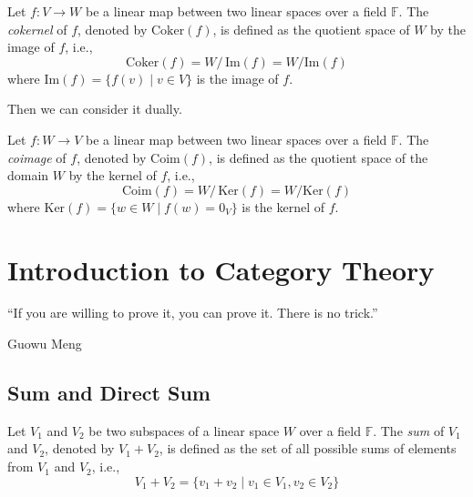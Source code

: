 \documentclass[
	11pt, %
	fleqn, %
	a4paper, %
]{LegrandOrangeBook}
\renewcommand{\ker}[1]{\text{Ker}(#1)} %
\renewcommand{\Im}[1]{\text{Im}(#1)} %
\newcommand{\quotient}[2]{#1 /\, #2} %
\newcommand{\F}{\mathbb{F}} %
\newcommand{\coker}[1]{\text{Coker}(#1)} %
\newcommand{\coim}[1]{\text{Coim}(#1)} %
\begin{document}
\begin{definition}[Cokernel]
    Let $f : V \to W$ be a linear map between two linear spaces over a field $\F$. The \emph{cokernel} of $f$, denoted by $\coker{f}$, is defined as the quotient space of $W$ by the image of $f$, i.e., 
    \[
        \coker{f} = \quotient{W}{\Im{f}} = W / \Im{f}
    \]
    where $\Im{f} = \{ f(v) \mid v \in V \}$ is the image of $f$.
\end{definition}

Then we can consider it dually.

\begin{center}
\end{center}

\begin{definition}[Coimage]
    Let $f : W \to V$ be a linear map between two linear spaces over a field $\F$. The \emph{coimage} of $f$, denoted by $\coim{f}$, is defined as the quotient space of the domain $W$ by the kernel of $f$, i.e.,
    \[
        \coim{f} = \quotient{W}{\ker{f}} = W / \ker{f}
    \]
    where $\ker{f} = \{ w \in W \mid f(w) = 0_V \}$ is the kernel of $f$.
\end{definition}

\chapter{Introduction to Category Theory}

\epigraph{``If you are willing to prove it, you can prove it. There is no trick.''}{Guowu Meng}

\section{Sum and Direct Sum}

\begin{definition}
    Let $V_1$ and $V_2$ be two subspaces of a linear space $W$ over a field $\F$. The \emph{sum} of $V_1$ and $V_2$, denoted by $V_1 + V_2$, is defined as the set of all possible sums of elements from $V_1$ and $V_2$, i.e.,
    \[
        V_1 + V_2 = \{ v_1 + v_2 \mid v_1 \in V_1, v_2 \in V_2 \}
    \]
\end{definition}
\end{document}
